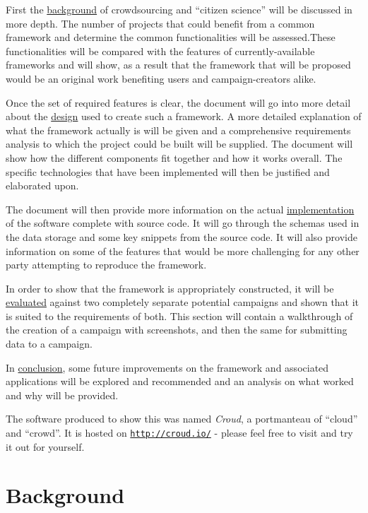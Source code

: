 \documentclass{article}
\begin{document}
		First the \hyperref[sec:background]{background} of crowdsourcing and ``citizen science'' will be discussed in more depth. The number of projects that could benefit from a common framework and determine the common functionalities will be assessed.These functionalities will be compared with the features of currently-available frameworks and will show, as a result that the framework that will be proposed would be an original work benefiting users and campaign-creators alike.

		Once the set of required features is clear, the document will go into more detail about the \hyperref[sec:architecture]{design} used to create such a framework. A more detailed explanation of what the framework actually is will be given and a comprehensive requirements analysis to which the project could be built will be supplied. The document will show how the different components fit together and how it works overall. The specific technologies that have been implemented will then be justified and elaborated upon.

		The document will then provide more information on the actual \hyperref[sec:implementation]{implementation} of the software complete with source code. It will go through the schemas used in the data storage and some key snippets from the source code. It will also provide information on some of the features that would be more challenging for any other party attempting to reproduce the framework.

		In order to show that the framework is appropriately constructed, it will be \hyperref[sec:evaluation]{evaluated} against two completely separate potential campaigns and shown that it is suited to the requirements of both. This section will contain a walkthrough of the creation of a campaign with screenshots, and then the same for submitting data to a campaign.

		In \hyperref[sec:conclusion]{conclusion}, some future improvements on the framework and associated applications will be explored and recommended and an analysis on what worked and why will be provided.

		The software produced to show this was named \emph{Croud}, a portmanteau of ``cloud'' and ``crowd''. It is hosted on \href{http://croud.io/}{\nolinkurl{http://croud.io/}} - please feel free to visit and try it out for yourself.

	\section{Background}
	\label{sec:background}
\end{document}
